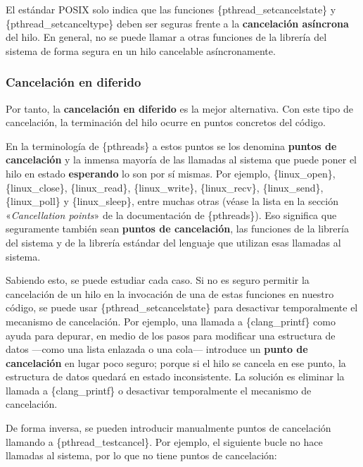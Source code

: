 El estándar POSIX solo indica que las funciones
\{pthread\_setcancelstate\} y \{pthread\_setcanceltype\} deben ser
seguras frente a la \textbf{cancelación asíncrona} del hilo. En general,
no se puede llamar a otras funciones de la librería del sistema de forma
segura en un hilo cancelable asíncronamente.

\subsubsection{Cancelación en
diferido}\label{_cancelaciuxf3n_en_diferido}

{} Por tanto, la \textbf{cancelación en diferido} es la mejor
alternativa. Con este tipo de cancelación, la terminación del hilo
ocurre en puntos concretos del código.

En la terminología de \{pthreads\} a estos puntos se los denomina
\textbf{puntos de cancelación}{} y la inmensa mayoría de las llamadas al
sistema que puede poner el hilo en estado \textbf{esperando} lo son por
sí mismas. Por ejemplo, \{linux\_open\}, \{linux\_close\},
\{linux\_read\}, \{linux\_write\}, \{linux\_recv\}, \{linux\_send\},
\{linux\_poll\} y \{linux\_sleep\}, entre muchas otras (véase la lista
en la sección «\emph{Cancellation points}» de la documentación de
\{pthreads\}). Eso significa que seguramente también sean \textbf{puntos
de cancelación}, las funciones de la librería del sistema y de la
librería estándar del lenguaje que utilizan esas llamadas al sistema.

Sabiendo esto, se puede estudiar cada caso. Si no es seguro permitir la
cancelación de un hilo en la invocación de una de estas funciones en
nuestro código, se puede usar \{pthread\_setcancelstate\} para
desactivar temporalmente el mecanismo de cancelación. Por ejemplo, una
llamada a \{clang\_printf\} como ayuda para depurar, en medio de los
pasos para modificar una estructura de datos ---como una lista enlazada
o una cola--- introduce un \textbf{punto de cancelación} en lugar poco
seguro; porque si el hilo se cancela en ese punto, la estructura de
datos quedará en estado inconsistente. La solución es eliminar la
llamada a \{clang\_printf\} o desactivar temporalmente el mecanismo de
cancelación.

De forma inversa, se pueden introducir manualmente puntos de cancelación
llamando a \{pthread\_testcancel\}. Por ejemplo, el siguiente bucle no
hace llamadas al sistema, por lo que no tiene puntos de cancelación:

\begin{Shaded}
\begin{Highlighting}[]
\OperatorTok{=} \OperatorTok{;}
 \OperatorTok{(} \OperatorTok{=} \OperatorTok{;}\OperatorTok{\textless{}=}\OperatorTok{;}\OperatorTok{++} \OperatorTok{)}
\OperatorTok{\{}
\OperatorTok{=}\OperatorTok{*}\OperatorTok{;}
\OperatorTok{\}}
\end{Highlighting}
\end{Shaded}

